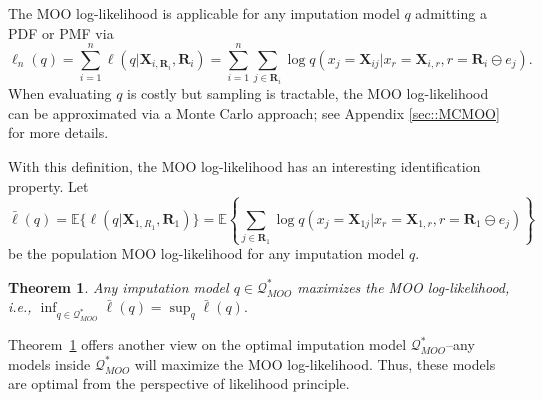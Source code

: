 \documentclass[aos, preprint]{imsart}
\theoremstyle{plain}
\newtheorem{theorem}{Theorem}[section]
\theoremstyle{definition}
\newtheorem{remark}[theorem]{Remark}
\newcommand{\E}{\mbox{$\mathbb{E}$}}
\newcommand{\bX}{\mathbf{X}}
\newcommand{\bR}{\mathbf{R}}
\begin{document}
The MOO log-likelihood is applicable for any imputation model $q$ admitting a PDF or PMF via
$$
\ell_n(q)=  \sum_{i=1}^n \ell(q|\bX_{i,\bR_i},\bR_i)  = \sum_{i=1}^n\sum_{j \in \bR_i} \log q(x_j = \bX_{ij}|x_{r} = \bX_{i, r}, r = \bR_i\ominus e_j).
$$
When evaluating $q$ is costly but sampling is tractable,  
the MOO log-likelihood  can be approximated via a Monte Carlo approach; see Appendix \ref{sec::MCMOO} for more details.

With this definition, the MOO log-likelihood has an interesting identification property. 
Let
\begin{equation}
\bar \ell(q) = \E\{\ell(q|\bX_{1,R_1},\bR_1)\} = \E\left\{\sum_{j \in \bR_1} \log q(x_j = \bX_{1j}|x_{r} = \bX_{1, r}, r = \bR_1\ominus e_j)\right\}
\label{eq::MOO::likelihood3}
\end{equation}
be the population MOO log-likelihood 
for any imputation model $q$.
\begin{theorem}
Any imputation model $q\in  \mathcal{Q}^*_{MOO}$ maximizes
the MOO log-likelihood, i.e., 
$\inf_{q\in \mathcal{Q}^*_{MOO}} \bar \ell(q) = \sup_{q} \bar\ell(q).$
\label{thm::MOO::ID}
\end{theorem}


Theorem~\ref{thm::MOO::ID} offers another view on the optimal imputation model $\mathcal{Q}^*_{MOO}$--any models
inside $\mathcal{Q}^*_{MOO}$ will maximize the MOO log-likelihood.
Thus, these models are optimal  from the perspective of likelihood principle. 









\end{document}
